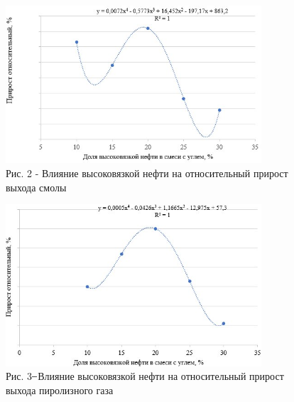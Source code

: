 \begin{figure}[H]
	\centering
	\includegraphics[width=0.85\textwidth]{media/chem/image114}
	\caption*{Рис. 2 - Влияние высоковязкой нефти на относительный прирост
выхода смолы}
\end{figure}

\begin{figure}[H]
	\centering
	\includegraphics[width=0.85\textwidth]{media/chem/image115}
	\caption*{Рис. 3 ̶ Влияние высоковязкой нефти на относительный прирост
выхода пиролизного газа}
\end{figure}

